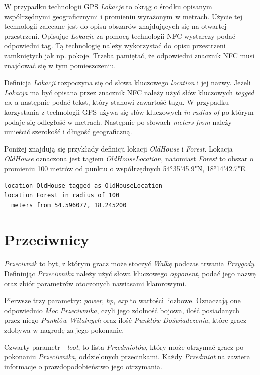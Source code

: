 \documentclass[openright]{xmgr}
\begin{document}
W przypadku technologii GPS \textit{Lokacje} to okrąg o środku opisanym współrzędnymi geograficznymi i promieniu wyrażonym w metrach. Użycie tej technologii zalecane jest do opisu obszarów znajdujących się na otwartej przestrzeni.
Opisując \textit{Lokacje} za pomocą technologii NFC wystarczy podać odpowiedni tag. Tą technologię należy wykorzystać do opisu przestrzeni zamkniętych jak np. pokoje. Trzeba pamiętać, że odpowiedni znacznik NFC musi znajdować się w tym pomieszczeniu.

Definicja \textit{Lokacji} rozpoczyna się od słowa kluczowego \textit{location} i jej nazwy. Jeżeli \textit{Lokacja} ma być opisana przez znacznik NFC należy użyć słów kluczowych \textit{tagged as}, a następnie podać tekst, który stanowi zawartość tagu. W przypadku korzystania z technologii GPS używa się słów kluczowych \textit{in radius of} po którym podaje się odległość w metrach. Następnie po słowach \textit{meters from} należy umieścić szerokość i długość geograficzną.

Poniżej znajdują się przykłady definicji lokacji \textit{OldHouse} i \textit{Forest}. Lokacja \textit{OldHouse} oznaczona jest tagiem \textit{OldHouseLocation}, natomiast \textit{Forest} to obszar o promieniu 100 metrów od punktu o współrzędnych 54°35'45.9"N, 18°14'42.7"E.
\begin{verbatim}
location OldHouse tagged as OldHouseLocation
location Forest in radius of 100 
  meters from 54.596077, 18.245200
\end{verbatim}

\section{Przeciwnicy}

\textit{Przeciwnik} to byt, z którym gracz może stoczyć \textit{Walkę} podczas trwania \textit{Przygody}. Definiując \textit{Przeciwnika} należy użyć słowa kluczowego \textit{opponent}, podać jego nazwę oraz zbiór parametrów otoczonych nawiasami klamrowymi.

Pierwsze trzy parametry: \textit{power}, \textit{hp}, \textit{exp} to wartości liczbowe. Oznaczają one odpowiednio \textit{Moc Przeciwnika}, czyli jego zdolność bojowa, ilość posiadanych przez niego \textit{Punktów Witalnych} oraz ilość \textit{Punktów Doświadczenia}, które gracz zdobywa w nagrodę za jego pokonanie.

Czwarty parametr - \textit{loot}, to lista \textit{Przedmiotów}, który może otrzymać gracz po pokonaniu \textit{Przeciwnika}, oddzielonych przecinkami. Każdy \textit{Przedmiot} na zawiera informacje o prawdopodobieństwo jego otrzymania.
\end{document}
